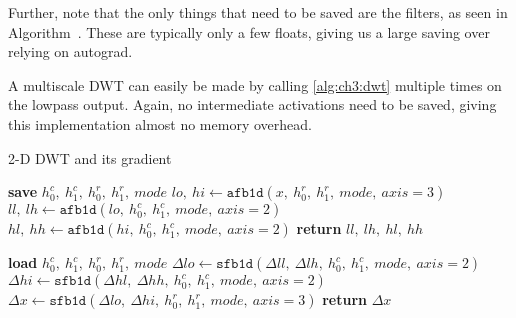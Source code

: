 Further, note that the only things that
need to be saved are the filters, as seen in
Algorithm~. These are typically only a
few floats, giving us a large saving over relying on autograd.

A multiscale DWT can easily be made by calling \autoref{alg:ch3:dwt}
multiple times on the lowpass output. Again, no intermediate activations need to be
saved, giving this implementation almost no memory overhead.

\begin{algorithm}[tb]
\caption{2-D DWT and its gradient}\label{alg:ch3:dwt}
\begin{algorithmic}[1]
  \State \textbf{save} $h_0^c,\ h_1^c,\ h_0^r,\ h_1^r,\ mode$  \label{line:ch3:dwt_save}
  \State $lo,\ hi \gets \mathtt{afb1d}(x,\ h_0^r,\ h_1^r,\ mode,\ axis=3)$ 
  \State $ll,\ lh \gets \mathtt{afb1d}(lo,\ h_0^c,\ h_1^c,\ mode,\ axis=2)$ 
  \State $hl,\ hh \gets \mathtt{afb1d}(hi,\ h_0^c,\ h_1^c,\ mode,\ axis=2)$ 
  \State \textbf{return} $ll,\ lh,\ hl,\ hh$
\EndFunction
\end{algorithmic}\vspace{10pt}
\begin{algorithmic}[1]
  \State \textbf{load} $h_0^c,\ h_1^c,\ h_0^r,\ h_1^r,\ mode$
  \State $\Delta lo \gets \mathtt{sfb1d}(\Delta ll,\ \Delta lh,\ h_0^c,\ h_1^c,\ mode,\ axis=2) $
  \State $\Delta hi \gets \mathtt{sfb1d}(\Delta hl,\ \Delta hh,\ h_0^c,\ h_1^c,\ mode,\ axis=2) $
  \State $\Delta x \gets \mathtt{sfb1d}(\Delta lo,\ \Delta hi,\ h_0^r,\ h_1^r,\ mode,\ axis=3) $
  \State \textbf{return} $\Delta x$
\EndFunction
\end{algorithmic}
\end{algorithm}


